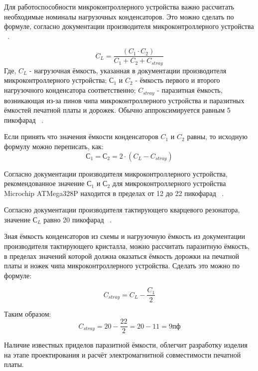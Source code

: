 Для работоспособности микроконтроллерного устройства важно рассчитать
необходимые номиналы нагрузочных конденсаторов. Это можно сделать по
формуле, согласно документации производителя микроконтроллерного
устройства ~\cite{microchip-Calculating-crystal-load-capacitor}.

\begin{equation}
  C_L = \frac{(C_1 \cdot C_2 )}{C_1 + C_2 + C_{stray}}
\end{equation}
Где,
$C_L$ - нагрузочная ёмкость, указанная в документации производителя микроконтроллерного устройства;
$С_1$ и $C_2$ - ёмкость первого и второго нагрузочного конденсатора соответственно;
$C_{stray}$ - паразитная ёмкость, возникающая из-за пинов чипа
микроконтроллерного устройства и паразитных ёмкостей печатной платы и
дорожек. Обычно аппроксимируется равным 5 пикофарад ~\cite{microchip-Calculating-crystal-load-capacitor}.

Если принять что значения ёмкости конденсаторов $C_1$ и $C_2$ равны,
то исходную формулу можно переписать, как:
\begin{equation}
  С_1 = С_2 = 2 \cdot (C_L - C_{stray})
\end{equation}


Согласно документации производителя микроконтроллерного устройства,
рекомендованное значение $С_1$ и $С_2$ для микроконтроллерного
устройства Microchip ATMega328P находится в пределах от 12 до
22 пикофарад ~\cite{microchip-atmega328p-datasheet}.

Согласно документации производителя тактирующего кварцевого резонатора, значение $С_L$ 
равно 20 пикофарад ~\cite{crystal-datasheet}.



Зная ёмкость конденсаторов из схемы и нагрузочную ёмкость из
документации производителя тактирующего кристалла, можно
рассчитать паразитную ёмкость, в пределах значений которой должна
оказаться ёмкость дорожки на печатной платы и ножек чипа
микроконтроллерного устройства. Сделать это можно по формуле:

\begin{equation}
  C_{stray} = C_L - \frac{C_1}{2}
\end{equation}

Таким образом:
$$C_{stray} = 20 - \frac{22}{2} = 20 - 11 = 9пф$$

Наличие известных приделов паразитной ёмкости, облегчит разработку
изделия на этапе проектирования и расчёт электромагнитной
совместимости печатной платы.

\newpage

